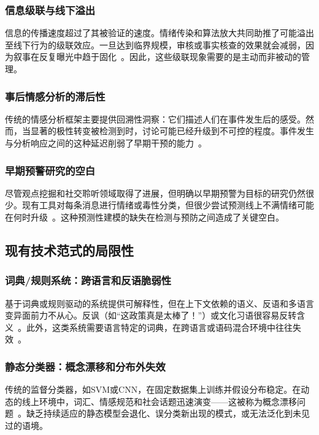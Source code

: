 \documentclass[conference]{IEEEtran}
\begin{document}
\subsubsection{信息级联与线下溢出}

信息的传播速度超过了其被验证的速度。情绪传染和算法放大共同助推了可能溢出至线下行为的级联效应。一旦达到临界规模，审核或事实核查的效果就会减弱，因为叙事在反复曝光中趋于固化~\cite{Vosoughi2018}。因此，这些级联现象需要的是主动而非被动的管理。

\subsubsection{事后情感分析的滞后性}

传统的情感分析框架主要提供回溯性洞察：它们描述人们在事件发生后的感受。然而，当显著的极性转变被检测到时，讨论可能已经升级到不可控的程度。事件发生与分析响应之间的这种延迟削弱了早期干预的能力~\cite{Wang2020}。

\subsubsection{早期预警研究的空白}

尽管观点挖掘和社交聆听领域取得了进展，但明确以早期预警为目标的研究仍然很少。现有工具对每条消息进行情绪或毒性分类，但很少尝试预测线上不满情绪可能在何时升级~\cite{Wang2020}。这种预测性建模的缺失在检测与预防之间造成了关键空白。

\subsection{现有技术范式的局限性}

\subsubsection{词典/规则系统：跨语言和反语脆弱性}

基于词典或规则驱动的系统提供可解释性，但在上下文依赖的语义、反语和多语言变异面前力不从心。反讽（如“这政策真是太棒了！”）或文化习语很容易反转含义~\cite{Dhumpati2025}。此外，这类系统需要语言特定的词典，在跨语言或语码混合环境中往往失效~\cite{Kaity2020}。

\subsubsection{静态分类器：概念漂移和分布外失效}

传统的监督分类器，如SVM或CNN，在固定数据集上训练并假设分布稳定。在动态的线上环境中，词汇、情感规范和社会话题迅速演变——这被称为概念漂移问题~\cite{Gama2014}。缺乏持续适应的静态模型会退化、误分类新出现的模式，或无法泛化到未见过的语境。
\end{document}
